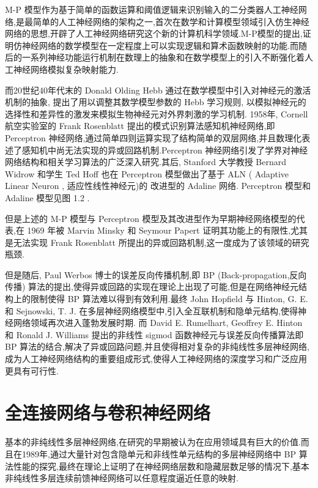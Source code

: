 M-P 模型作为基于简单的函数运算和阈值逻辑来识别输入的二分类器人工神经网络,是最简单的人工神经网络的架构之一,首次在数学和计算模型领域引入仿生神经网络的思想,开辟了人工神经网络研究这个新的计算机科学领域.M-P模型的提出,证明仿神经网络的数学模型在一定程度上可以实现逻辑和算术函数映射的功能.而随后的一系列神经功能运行机制在数理上的抽象和在数学模型上的引入不断强化着人工神经网络模拟复杂映射能力.

而20世纪40年代末的 Donald Olding Hebb 通过在数学模型中引入对神经元的激活机制的抽象, 提出了用以调整其数学模型参数的 Hebb 学习规则, 以模拟神经元的选择性和差异性的激发来模拟生物神经元对外界刺激的学习机制. 1958年, Cornell 航空实验室的 Frank Rosenblatt 提出的模式识别算法感知机神经网络,即 Perceptron 神经网络,通过简单四则运算实现了结构简单的双层网络,并且数理化表述了感知机中尚无法实现的异或回路机制.Perceptron 神经网络引发了学界对神经网络结构和相关学习算法的广泛深入研究.其后, Stanford 大学教授 Bernard Widrow 和学生 Ted Hoff 也在 Perceptron 模型做出了基于 ALN ( Adaptive Linear Neuron , 适应性线性神经元)的 改进型的 Adaline 网络. Perceptron 模型和 Adaline 模型见图 1.2 .

但是上述的 M-P 模型与 Perceptron 模型及其改进型作为早期神经网络模型的代表,在 1969 年被 Marvin Minsky 和 Seymour Papert 证明其功能上的有限性,尤其是无法实现 Frank Rosenblatt 所提出的异或回路机制,这一度成为了该领域的研究瓶颈. 

但是随后, Paul Werbos 博士的误差反向传播机制,即 BP (Back-propagation,反向传播) 算法的提出,使得异或回路的实现在理论上出现了可能,但是在网络神经元结构上的限制使得 BP 算法难以得到有效利用.最终 John Hopfield 与 Hinton, G. E. 和 Sejnowski, T. J. 在多层神经网络模型中,引入全互联机制和隐单元结构,使得神经网络领域再次进入蓬勃发展时期. 而 David E. Rumelhart, Geoffrey E. Hinton 和 Ronald J. Williams 提出的非线性 sigmod 函数神经元与误差反向传播算法即 BP 算法的结合,解决了异或回路问题,并且使得相对复杂的非纯线性多层神经网络,成为人工神经网络结构的重要组成形式,使得人工神经网络的深度学习和广泛应用更具有可行性.

\section{全连接网络与卷积神经网络}
基本的非纯线性多层神经网络,在研究的早期被认为在应用领域具有巨大的价值.而且在1989年,通过大量针对包含隐单元和非线性单元结构的多层神经网络中 BP 算法性能的探究,最终在理论上证明了在神经网络层数和隐藏层数足够的情况下,基本非纯线性多层连续前馈神经网络可以任意程度逼近任意的映射.

